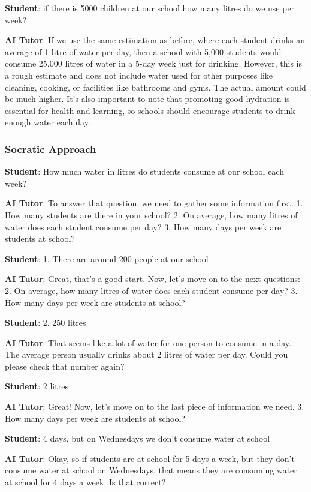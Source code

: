 \documentclass[
  11pt,
]{article}
\begin{document}
\textbf{Student}: if there is 5000 children at our school how many litres do we use per week?

\textbf{AI Tutor}: If we use the same estimation as before, where each student drinks an average of 1 litre of water per day, then a school with 5,000 students would consume 25,000 litres of water in a 5-day week just for drinking. However, this is a rough estimate and does not include water used for other purposes like cleaning, cooking, or facilities like bathrooms and gyms. The actual amount could be much higher. It's also important to note that promoting good hydration is essential for health and learning, so schools should encourage students to drink enough water each day.

\subsubsection{Socratic Approach}\label{socratic-approach}

\textbf{Student}: How much water in litres do students consume at our school each week?

\textbf{AI Tutor}: To answer that question, we need to gather some information first. 1. How many students are there in your school? 2. On average, how many litres of water does each student consume per day? 3. How many days per week are students at school?

\textbf{Student}: 1. There are around 200 people at our school

\textbf{AI Tutor}: Great, that's a good start. Now, let's move on to the next questions: 2. On average, how many litres of water does each student consume per day? 3. How many days per week are students at school?

\textbf{Student}: 2. 250 litres

\textbf{AI Tutor}: That seems like a lot of water for one person to consume in a day. The average person usually drinks about 2 litres of water per day. Could you please check that number again?

\textbf{Student}: 2 litres

\textbf{AI Tutor}: Great! Now, let's move on to the last piece of information we need. 3. How many days per week are students at school?

\textbf{Student}: 4 days, but on Wednesdays we don't consume water at school

\textbf{AI Tutor}: Okay, so if students are at school for 5 days a week, but they don't consume water at school on Wednesdays, that means they are consuming water at school for 4 days a week. Is that correct?
\end{document}
